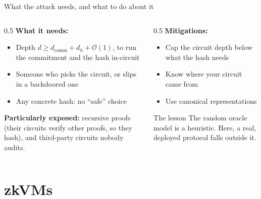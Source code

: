\ifdefined\PRESENTATION\else\PassOptionsToClass{handout}{beamer}\fi\documentclass[aspectratio=169, lualatex]{beamer}
\begin{document}
\begin{frame}{What the attack needs, and what to do about it}
	\begin{columns}[T]
		\begin{column}{0.5\textwidth}
			\textbf{What it needs:}
			\begin{itemize}
				\item Depth $d \geq d_{\text{comm}} + d_h + \mathcal{O}(1)$, to run the commitment and the hash in-circuit
				\item Someone who picks the circuit, or slips in a backdoored one
				\item Any concrete hash: no ``safe'' choice
			\end{itemize}
			\textbf{Particularly exposed:} recursive proofs (their circuits verify other proofs, so they hash), and third-party circuits nobody audits.
		\end{column}
		\begin{column}{0.5\textwidth}
			\textbf{Mitigations:}
			\begin{itemize}
				\item Cap the circuit depth below what the hash needs
				\item Know where your circuit came from
				\item Use canonical representations
			\end{itemize}
			\begin{exampleblock}{The lesson}
				The random oracle model is a heuristic. Here, a real, deployed protocol falls outside it.
			\end{exampleblock}
		\end{column}
	\end{columns}
\end{frame}

\section{zkVMs}
\end{document}
